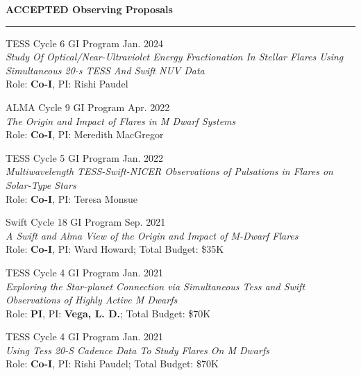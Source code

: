 \documentclass[12pt]{article}
\begin{document}
\noindent
{\bf ACCEPTED Observing Proposals} \\
\vspace{-10mm}
\begin{center}
\rule{\textwidth}{0.2mm}
\end{center}
\vspace{-3mm}
\noindent
\begin{etaremune}
\renewcommand\labelenumi{\bfseries\theenumi .}

\item TESS Cycle 6 GI Program \hfill Jan. 2024 \\
\textit{Study Of Optical/Near-Ultraviolet Energy Fractionation In Stellar Flares Using Simultaneous 20-s TESS And Swift NUV Data} \\ Role: \textbf{Co-I}, PI: Rishi Paudel

\item ALMA Cycle 9 GI Program \hfill Apr. 2022 \\
\textit{The Origin and Impact of Flares in M Dwarf Systems} \\ Role: \textbf{Co-I}, PI: Meredith MacGregor

\item TESS Cycle 5 GI Program \hfill Jan. 2022 \\
\textit{Multiwavelength TESS-Swift-NICER Observations of Pulsations in Flares on Solar-Type Stars} \\ Role: \textbf{Co-I}, PI: Teresa Monsue

\item Swift Cycle 18 GI Program \hfill Sep. 2021 \\
\textit{A Swift and Alma View of the Origin and Impact of M-Dwarf Flares} \\ Role: \textbf{Co-I}, PI: Ward Howard; Total Budget: \$35K

\item TESS Cycle 4 GI Program \hfill Jan. 2021 \\
\textit{Exploring the Star-planet Connection via Simultaneous Tess and Swift Observations of Highly Active M Dwarfs} \\ Role: \textbf{PI}, PI: \textbf{Vega, L. D.}; Total Budget: \$70K

\item TESS Cycle 4 GI Program \hfill Jan. 2021 \\
\textit{Using Tess 20-S Cadence Data To Study Flares On M Dwarfs} \\ Role: \textbf{Co-I}, PI: Rishi Paudel; Total Budget: \$70K


\end{etaremune}
\end{document}
